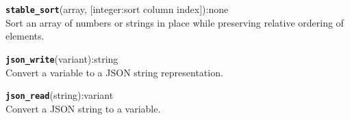 \hrulefill

\texttt{{\large\textbf{stable\_sort}}}\textsf{(array, [integer:sort column index]):none}\\
 Sort an array of numbers or strings in place while preserving relative ordering of elements.

\hrulefill

\texttt{{\large\textbf{json\_write}}}\textsf{(variant):string}\\
 Convert a variable to a JSON string representation.

\hrulefill

\texttt{{\large\textbf{json\_read}}}\textsf{(string):variant}\\
 Convert a JSON string to a variable.
